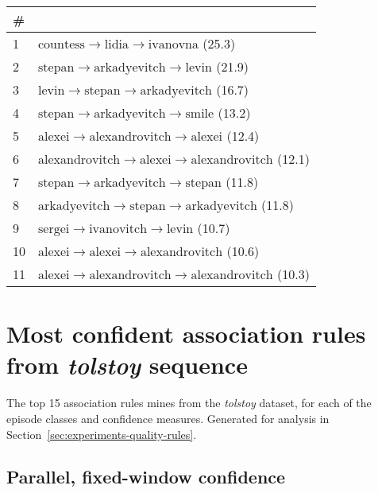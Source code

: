 \begin{appendices}
\begin{longtable}{p{20pt}|p{\dimexpr\textwidth-20pt-\tabcolsep\relax}}
\# & \\
\hline
1 & $ \text{countess} \to \text{lidia} \to \text{ivanovna} $ (25.3) \\
2 & $ \text{stepan} \to \text{arkadyevitch} \to \text{levin} $ (21.9) \\
3 & $ \text{levin} \to \text{stepan} \to \text{arkadyevitch} $ (16.7) \\
4 & $ \text{stepan} \to \text{arkadyevitch} \to \text{smile} $ (13.2) \\
5 & $ \text{alexei} \to \text{alexandrovitch} \to \text{alexei} $ (12.4) \\
6 & $ \text{alexandrovitch} \to \text{alexei} \to \text{alexandrovitch} $ (12.1) \\
7 & $ \text{stepan} \to \text{arkadyevitch} \to \text{stepan} $ (11.8) \\
8 & $ \text{arkadyevitch} \to \text{stepan} \to \text{arkadyevitch} $ (11.8) \\
9 & $ \text{sergei} \to \text{ivanovitch} \to \text{levin} $ (10.7) \\
10 & $ \text{alexei} \to \text{alexei} \to \text{alexandrovitch} $ (10.6) \\
11 & $ \text{alexei} \to \text{alexandrovitch} \to \text{alexandrovitch} $ (10.3) \\
\end{longtable}
\fi

\chapter{%
Most confident association rules from \emph{tolstoy} sequence
}
\label{appendix:confident-association-rules}

The top 15 association rules mines from the \emph{tolstoy} dataset, for each of the episode classes and confidence measures. Generated for analysis in Section~\ref{sec:experiments-quality-rules}.

\section{Parallel, fixed-window confidence}
\label{appendix:rules-par-fwi}


\end{appendices}
